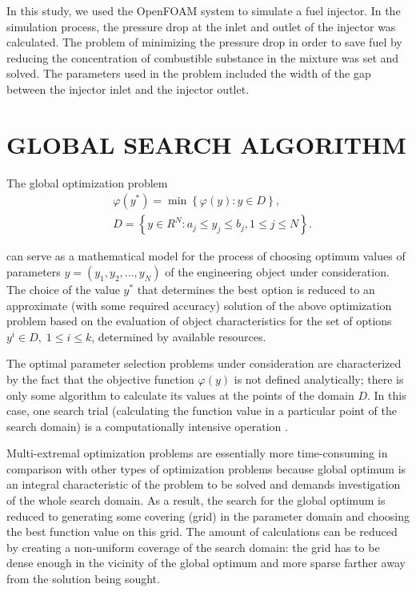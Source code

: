 \documentclass{aip-cp}
\begin{document}
In this study, we used the OpenFOAM system to simulate a fuel injector. In the simulation process, the pressure drop at the inlet and outlet of the injector was calculated. The problem of minimizing the pressure drop in order to save fuel by reducing the concentration of combustible substance in the mixture was set and solved. The parameters used in the problem included the width of the gap between the injector inlet and the injector outlet.

\section{GLOBAL SEARCH ALGORITHM}


The global optimization problem
\begin{eqnarray}\label{problem}
&\varphi(y^\ast)=\min{\left\{\varphi(y):y\in D\right\}},\\
&D=\left\{y\in R^N: a_j\leq y_j \leq b_j, 1\leq j \leq N \right\}.\label{D}
\end{eqnarray}

can serve as a mathematical model for the process of choosing optimum values of parameters $y=(y_1,y_2,...,y_N)$ of the engineering object under consideration.
The choice of the value  $y^*$ that determines the best option  is reduced to an approximate (with some required accuracy) solution of the above optimization problem based on the evaluation of object characteristics for the set of options $y^i\in D, \; 1 \leq i \leq k$, determined by available resources.

The optimal parameter selection problems under consideration are characterized by the fact that the objective function $\varphi(y)$ is not defined analytically; there is only some algorithm to calculate its values at the points of the domain $D$.  In this case, one search trial (calculating the function value in a particular point of the search domain) is a computationally intensive operation \cite{Kalyulin2017}.

Multi-extremal optimization problems are essentially more time-consuming in comparison with other types of optimization problems because global optimum is an integral characteristic of the problem to be solved and demands investigation of the whole search domain. As a result, the search for the global optimum is reduced to generating  some covering (grid) in the parameter domain and choosing the best function value on this grid. The amount of calculations can be reduced by creating a non-uniform coverage of the search domain: the grid has to be dense enough in the vicinity of the global optimum and more sparse farther away from the solution being sought.
\end{document}

